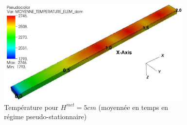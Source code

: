 \begin{frame}[fragile]
\begin{itemize}
\begin{columns}[T]
\begin{column}{0.7\textwidth}
\begin{figure}[H]
\end{figure}
    \end{column}
    \begin{column}{0.3\textwidth}
\begin{figure}[H]
\centering \includegraphics[width=\textwidth]{Figures/Fig5_Peybernes2020.png} \\
{\tiny Température pour $H^{met}=5cm$ (moyennée en temps en régime pseudo-stationnaire)}
\end{figure}
    \end{column}
    \end{columns}
\end{itemize}
\end{frame}
